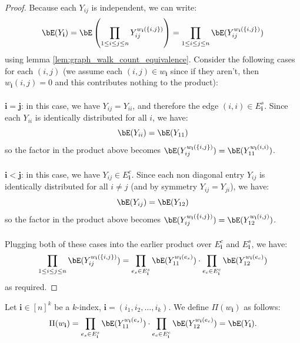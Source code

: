 \begin{proof}
  Because each $Y_{ij}$ is independent, we can write:
  $$
  \bE(Y_{\mathbf{i}}) = \bE\left(\prod_{1 \leq i \leq j \leq n} Y_{ij}^{w_{\mathbf{i}}(\{i, j\})}\right)
  = \prod_{1 \leq i \leq j \leq n} \bE(Y_{ij}^{w_{\mathbf{i}}(\{i, j\})})
  $$
  using lemma \ref{lem:graph_walk_count_equivalence}. Consider the following cases for each $(i, j)$ (we assume each $(i, j) \in w_{\mathbf{i}}$ since if they aren't, then $w_{\mathbf{i}}(i, j) = 0$ and this contributes nothing to the product):\\\\
  $\mathbf{i = j}$: in this case, we have $Y_{ij} = Y_{ii}$, and therefore the edge $(i, i) \in E_{\mathbf{i}}^{s}$. Since each $Y_{ii}$ is identically distributed for all $i$, we have:
  $$
  \bE(Y_{ii}) = \bE(Y_{11})
  $$
  so the factor in the product above becomes $\bE(Y_{ij}^{w_{\mathbf{i}}(\{i, j\})}) = \bE(Y_{11}^{w_{\mathbf{i}}(i, i)})$.\\\\
  $\mathbf{i < j}$: in this case, we have  $Y_{ij} \in E_{\mathbf{i}}^{c}$. Since each non diagonal entry $Y_{ij}$ is identically distributed for all $i \neq j$ (and by symmetry $Y_{ij} = Y_{ji}$), we have:
  $$
  \bE(Y_{ij}) = \bE(Y_{12})
  $$
  so the factor in the product above becomes $\bE(Y_{ij}^{w_{\mathbf{i}}(\{i, j\})}) = \bE(Y_{12}^{w_{\mathbf{i}}(i, j)})$.\\\\
  Plugging both of these cases into the earlier product over $E_{\mathbf{i}}^{c}$ and $E_{\mathbf{i}}^{s}$, we have:
  $$
  \prod_{1 \leq i \leq j \leq n} \bE(Y_{ij}^{w_{\mathbf{i}}(\{i, j\})}) = \prod_{e_s \in E_{\mathbf{i}}^s} \bE(Y_{11}^{w_{\mathbf{i}}(e_s)}) \cdot \prod_{e_c \in E_{\mathbf{i}}^c} \bE(Y_{12}^{w_{\mathbf{i}}(e_c)})
  $$
  as required.
\end{proof}


\begin{definition}
    \label{def:prod_expectation_matrix_multi_index}
    Let $\mathbf{i} \in [n]^{k}$ be a $k$-index, $\mathbf{i} = (i_1, i_2, \ldots, i_{k})$. We define
    $\Pi(w_{\mathbf{i}})$ as follows:
    $$
    \Pi (w_{\mathbf{i}}) = \prod_{e_s \in E_{\mathbf{i}}^s} \bE(Y_{11}^{w_{\mathbf{i}}(e_s)}) \cdot \prod_{e_c \in E_{\mathbf{i}}^c} \bE(Y_{12}^{w_{\mathbf{i}}(e_c)}) = \bE(Y_{\mathbf{i}}).
    $$
\end{definition}


